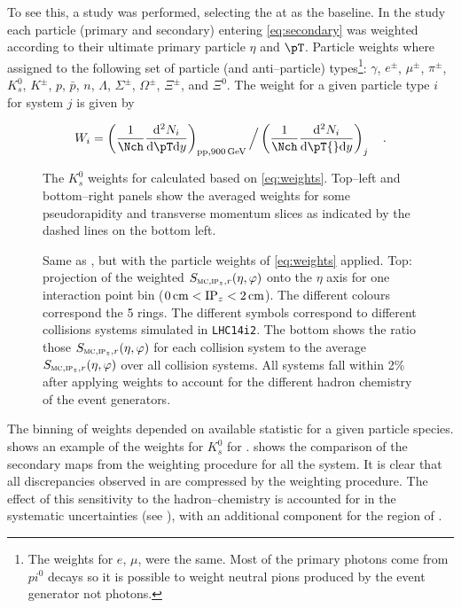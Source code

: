 To see this, a study was performed, selecting the \ppCol{} at
 as the baseline.  In the study each particle (primary
and secondary) entering \eqref{eq:secondary} was weighted according to
their ultimate primary particle $\eta$ and $\pT$.  Particle weights
where assigned to the following set of particle (and anti--particle)
types\footnote{The weights for $e$, $\mu$, were the same.  Most of the
  primary photons come from $pi^{0}$ decays so it is possible to
  weight neutral pions produced by the event generator not photons.}:
$\gamma$, 
$e^\pm$,
$\mu^\pm$,
$\pi^\pm$,
$K^0_{s}$, 
$K^\pm$,
$p$,
$\bar{p}$,
$n$,
$\Lambda$,
$\Sigma^\pm$,
$\Omega^\pm$,
$\Xi^\pm$, and
$\Xi^{0}$.
The weight for a given particle type $i$ for system $j$ is given by 

\begin{align}
  \label{eq:weights}
  W_{i}= \left(
  \frac1{\Nch}\diffFrac{^{2}N_{i}}{\pT\mathrm{d}y} \right)_{%
  \text{\ppCol{}},\GeV[900]{}} \Big/ 
  \left(\frac1{\Nch}\diffFrac{^{2}N_{i}}{\pT{}\mathrm{d}y}\right)_{j}\quad.
\end{align}

\begin{figure}[h!tbp]
  \centering
  \caption{The $K^{0}_{s}$ weights for \PbPbCol{} calculated based on
    \eqref{eq:weights}.  Top--left and bottom--right panels show the
    averaged weights for some pseudorapidity and transverse momentum
    slices as indicated by the dashed lines on the bottom left.}
  \label{fig:weights}
\end{figure} 

\begin{figure}[h!tbp]
 \centering
  \caption{Same as , but with the particle weights
    of \eqref{eq:weights} applied. Top: projection of the weighted
    $\SecMap$ onto the $\eta$ axis for one interaction point bin
    ($\unit[0]{cm}<\IPz{}<\unit[2]{cm}$).  The different colours
    correspond the 5 \FMD{} rings.  The different symbols correspond
    to different collisions systems simulated in \texttt{LHC14i2}.
    The bottom shows the ratio those $\SecMap$ for each collision
    system to the average $\SecMap$ over all collision systems. All
    systems fall within 2\% after applying weights to account for the
    different hadron chemistry of the event generators.}
  \label{fig:secmapweighted:all}
\end{figure} 

The binning of weights depended on available statistic for a given
particle species.   shows an example of the
weights for $K^{0}_{s}$ for
\PbPbCol{}.  shows the comparison of
the secondary maps from the weighting procedure for all the system. It
is clear that all discrepancies observed in
 are compressed by the weighting procedure.
The effect of this sensitivity to the hadron--chemistry is accounted
for in the systematic uncertainties (see
), with an additional component for the
region of . 

